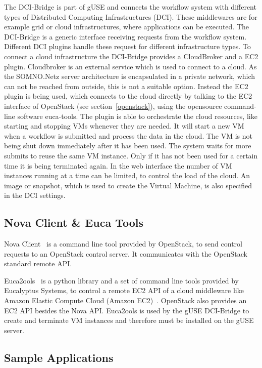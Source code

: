 The DCI-Bridge is part of gUSE and connects the workflow system with different types of Distributed Computing Infrastructures (DCI).
These middlewares are for example grid or cloud infrastructures, where applications can be executed.
The DCI-Bridge is a generic interface receiving requests from the workflow system.
Different DCI plugins handle these request for different infrastructure types.
To connect a cloud infrastructure the DCI-Bridge provides a CloudBroker and a EC2 plugin.
Cloudbroker is an external service which is used to connect to a cloud.
As the SOMNO.Netz server architecture is encapsulated in a private network, which can not be reached from outside, this is not a suitable option.
Instead the EC2 plugin is being used, which connects to the cloud directly by talking to the EC2 interface of OpenStack (see section~\ref{openstack}), using the opensource command-line software euca-tools.
The plugin is able to orchestrate the cloud resources, like starting and stopping VMs whenever they are needed.
It will start a new VM when a workflow is submitted and process the data in the cloud.
The VM is not being shut down immediately after it has been used.
The system waits for more submits to reuse the same VM instance.
Only if it has not been used for a certain time it is being terminated again.
In the web interface the number of VM instances running at a time can be limited, to control the load of the cloud. 
An image or snapshot, which is used to create the Virtual Machine, is also specified in the DCI settings.

\subsection{Nova Client \& Euca Tools}\label{euca}
Nova Client~\cite{nova} is a command line tool provided by OpenStack, to send control requests to an OpenStack control server. It communicates with the OpenStack standard remote API.

Euca2ools~\cite{eucatools} is a python library and a set of command line tools provided by Eucalyptus Systems, to control a remote EC2 API of a cloud middleware like Amazon Elastic Compute Cloud (Amazon EC2)~\cite{amazon}.
OpenStack also provides an EC2 API besides the Nova API.
Euca2ools is used by the gUSE DCI-Bridge to create and terminate VM instances and therefore must be installed on the gUSE server.

\subsection{Sample Applications}\label{applications}

